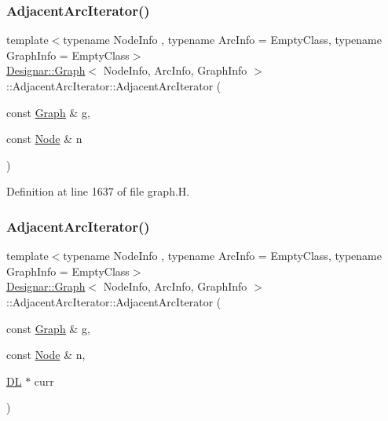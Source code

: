 \subsubsection{\texorpdfstring{Adjacent\+Arc\+Iterator()}{AdjacentArcIterator()}\hspace{0.1cm}{\footnotesize\ttfamily [2/5]}}
{\footnotesize\ttfamily template$<$typename Node\+Info , typename Arc\+Info  = Empty\+Class, typename Graph\+Info  = Empty\+Class$>$ \\
\hyperlink{class_designar_1_1_graph}{Designar\+::\+Graph}$<$ Node\+Info, Arc\+Info, Graph\+Info $>$\+::Adjacent\+Arc\+Iterator\+::\+Adjacent\+Arc\+Iterator (\begin{DoxyParamCaption}\item[{const \hyperlink{class_designar_1_1_graph}{Graph} \&}]{g,  }\item[{const \hyperlink{class_designar_1_1_graph_a5dfc7dba9d092ac489c72e40390c37d0}{Node} \&}]{n }\end{DoxyParamCaption})\hspace{0.3cm}{\ttfamily [inline]}}



Definition at line 1637 of file graph.\+H.

\mbox{\label{class_designar_1_1_graph_1_1_adjacent_arc_iterator_a97e3e5909f6e9b9b6b55cbc0fb2d5263}} 
\subsubsection{\texorpdfstring{Adjacent\+Arc\+Iterator()}{AdjacentArcIterator()}\hspace{0.1cm}{\footnotesize\ttfamily [3/5]}}
{\footnotesize\ttfamily template$<$typename Node\+Info , typename Arc\+Info  = Empty\+Class, typename Graph\+Info  = Empty\+Class$>$ \\
\hyperlink{class_designar_1_1_graph}{Designar\+::\+Graph}$<$ Node\+Info, Arc\+Info, Graph\+Info $>$\+::Adjacent\+Arc\+Iterator\+::\+Adjacent\+Arc\+Iterator (\begin{DoxyParamCaption}\item[{const \hyperlink{class_designar_1_1_graph}{Graph} \&}]{g,  }\item[{const \hyperlink{class_designar_1_1_graph_a5dfc7dba9d092ac489c72e40390c37d0}{Node} \&}]{n,  }\item[{\hyperlink{class_designar_1_1_d_l}{DL} $\ast$}]{curr }\end{DoxyParamCaption})\hspace{0.3cm}{\ttfamily [inline]}}




